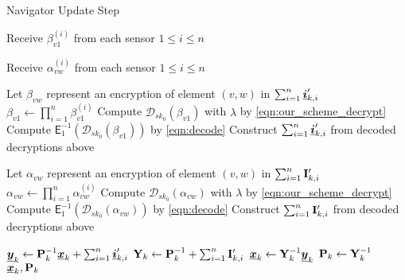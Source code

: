 \documentclass[twocolumn]{autart}
\begin{document}
\begin{algorithm}
    \caption{Navigator Update Step}\label{alg:nav_update}
    \begin{algorithmic}[1]
        
            \State Receive $\beta_{v1}^{(i)}$ from each sensor $1\leq i \leq n$
        \EndFor

            \State Receive $\alpha_{vw}^{(i)}$ from each sensor $1\leq i \leq n$
            \EndFor
        \EndFor

        \State Let $\beta_{vw}$ represent an encryption of element $(v,w)$ in $\sum_{i=1}^n{\boldsymbol{\underline{i}}}'_{k,i}$
            \State $\beta_{v1} \gets \prod_{i=1}^n\beta_{v1}^{(i)}$
            \State Compute $\mathcal{D}_{sk_0}(\beta_{v1})$ with $\lambda$ by \eqref{eqn:our_scheme_decrypt}
            \State Compute $\mathsf{E}^{-1}_{1}(\mathcal{D}_{sk_0}(\beta_{v1}))$ by \eqref{eqn:decode}
        \EndFor
        \State Construct $\sum_{i=1}^n{\boldsymbol{\underline{i}}}'_{k,i}$ from decoded decryptions above

        \State Let $\alpha_{vw}$ represent an encryption of element $(v,w)$ in $\sum_{i=1}^n{{\mathbf{I}}}'_{k,i}$
                \State $\alpha_{vw} \gets \prod_{i=1}^n\alpha_{vw}^{(i)}$
                \State Compute $\mathcal{D}_{sk_0}(\alpha_{vw})$ with $\lambda$ by \eqref{eqn:our_scheme_decrypt}
                \State Compute $\mathsf{E}^{-1}_{1}(\mathcal{D}_{sk_0}(\alpha_{vw}))$ by \eqref{eqn:decode}
            \EndFor
        \EndFor
        \State Construct $\sum_{i=1}^n{{\mathbf{I}}}'_{k,i}$ from decoded decryptions above

        \State ${\boldsymbol{\underline{y}}}_k \gets {\ensuremath{{\mathbf{P}}}}_{k}^{-1}{\boldsymbol{\underline{x}}}_{k} + \sum_{i=1}^n{\boldsymbol{\underline{i}}}'_{k,i}$
        \State ${{\mathbf{Y}}}_k \gets {\ensuremath{{\mathbf{P}}}}_{k}^{-1} + \sum_{i=1}^n{{\mathbf{I}}}'_{k,i}$
        \State ${\boldsymbol{\underline{x}}}_{k} \gets {\ensuremath{{\mathbf{Y}}}}_k^{-1}{\boldsymbol{\underline{y}}}_k$
        \State ${{\mathbf{P}}}_{k} \gets {\ensuremath{{\mathbf{Y}}}}_k^{-1}$
        \State \Return ${\boldsymbol{\underline{x}}}_{k}, {{\mathbf{P}}}_{k}$
        \EndProcedure
    \end{algorithmic}
\end{algorithm}
\end{document}
